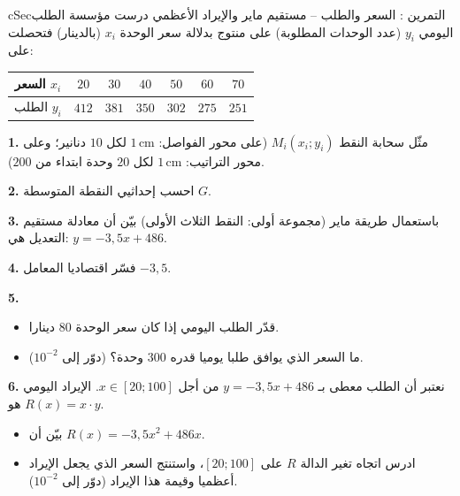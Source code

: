 \documentclass[12pt,a4paper]{article}
\newenvironment{BOX}[2]{\begin{otherlanguage}{english}\begin{arbox}{#1}{#2}}{\end{arbox}\end{otherlanguage}}
\newcounter{exo}
\newenvironment{tamrin}[1]{\stepcounter{exo}\begin{BOX}{cSec}{التمرين \theexo: #1}}{\end{BOX}}
\newenvironment{LTR}{\begin{otherlanguage}{english}}{\end{otherlanguage}}
\newcommand{\ar}[1]{\foreignlanguage{arabic}{#1}}
\newenvironment{sq}{\begin{itemize}[leftmargin=2.4em,itemsep=3pt]}{\end{itemize}}
\newcommand{\qa}{\item[(أ)]}\newcommand{\qb}{\item[(ب)]}\newcommand{\qc}{\item[(جـ)]}\newcommand{\qd}{\item[(د)]}\newcommand{\qe}{\item[(هـ)]}
\newcommand{\QQ}[1]{\par\smallskip\textbf{#1.} }
\begin{document}
\begin{tamrin}{السعر والطلب -- مستقيم ماير والإيراد الأعظمي}
درست مؤسسة الطلب اليومي $y_i$ (عدد الوحدات المطلوبة) على منتوج بدلالة سعر الوحدة $x_i$ (بالدينار) فتحصلت على:
\begin{center}\begin{LTR}\renewcommand{\arraystretch}{1.35}\small
\begin{tabular}{|c|c|c|c|c|c|c|}\hline
\rowcolor{cSec!12}\ar{السعر} $x_i$ & $20$ & $30$ & $40$ & $50$ & $60$ & $70$\\\hline
\ar{الطلب} $y_i$ & $412$ & $381$ & $350$ & $302$ & $275$ & $251$\\\hline
\end{tabular}\end{LTR}\end{center}
\QQ{1} مثّل سحابة النقط $M_i(x_i;y_i)$ (على محور الفواصل: $1\,\text{cm}$ لكل $10$ دنانير؛ وعلى محور التراتيب: $1\,\text{cm}$ لكل $20$ وحدة ابتداء من $200$).
\QQ{2} احسب إحداثيي النقطة المتوسطة $G$.
\QQ{3} باستعمال طريقة ماير (مجموعة أولى: النقط الثلاث الأولى) بيّن أن معادلة مستقيم التعديل هي: $y=-3{,}5x+486$.
\QQ{4} فسّر اقتصاديا المعامل $-3{,}5$.
\QQ{5}
\begin{sq}
\qa قدّر الطلب اليومي إذا كان سعر الوحدة $80$ دينارا.
\qb ما السعر الذي يوافق طلبا يوميا قدره $300$ وحدة؟ (دوّر إلى $10^{-2}$).
\end{sq}
\QQ{6} نعتبر أن الطلب معطى بـ $y=-3{,}5x+486$ من أجل $x\in[20;100]$. الإيراد اليومي هو $R(x)=x\cdot y$.
\begin{sq}
\qa بيّن أن $R(x)=-3{,}5x^{2}+486x$.
\qb ادرس اتجاه تغير الدالة $R$ على $[20;100]$، واستنتج السعر الذي يجعل الإيراد أعظميا وقيمة هذا الإيراد (دوّر إلى $10^{-2}$).
\end{sq}
\end{tamrin}
\end{document}
